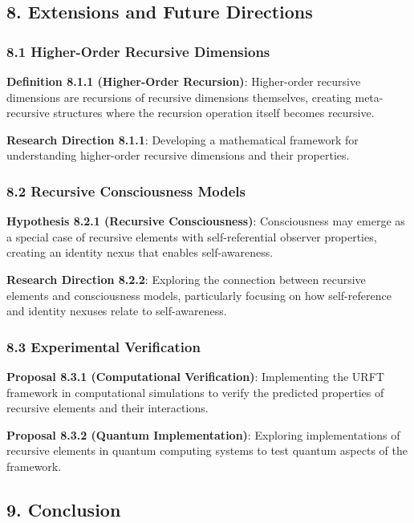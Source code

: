 \documentclass[
]{article}
\begin{document}
\subsection{8. Extensions and Future
Directions}\label{extensions-and-future-directions}

\subsubsection{8.1 Higher-Order Recursive
Dimensions}\label{higher-order-recursive-dimensions}

\textbf{Definition 8.1.1 (Higher-Order Recursion)}: Higher-order
recursive dimensions are recursions of recursive dimensions themselves,
creating meta-recursive structures where the recursion operation itself
becomes recursive.

\textbf{Research Direction 8.1.1}: Developing a mathematical framework
for understanding higher-order recursive dimensions and their
properties.

\subsubsection{8.2 Recursive Consciousness
Models}\label{recursive-consciousness-models}

\textbf{Hypothesis 8.2.1 (Recursive Consciousness)}: Consciousness may
emerge as a special case of recursive elements with self-referential
observer properties, creating an identity nexus that enables
self-awareness.

\textbf{Research Direction 8.2.2}: Exploring the connection between
recursive elements and consciousness models, particularly focusing on
how self-reference and identity nexuses relate to self-awareness.

\subsubsection{8.3 Experimental
Verification}\label{experimental-verification}

\textbf{Proposal 8.3.1 (Computational Verification)}: Implementing the
URFT framework in computational simulations to verify the predicted
properties of recursive elements and their interactions.

\textbf{Proposal 8.3.2 (Quantum Implementation)}: Exploring
implementations of recursive elements in quantum computing systems to
test quantum aspects of the framework.

\subsection{9. Conclusion}\label{conclusion-5}
\end{document}
